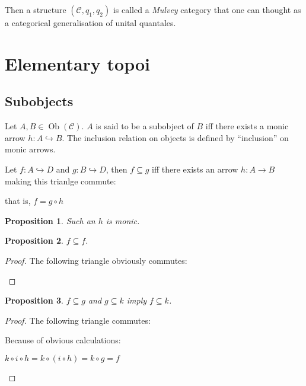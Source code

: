 \documentclass[a4paper]{article}
\theoremstyle{defin}
\theoremstyle{theorem}
\theoremstyle{claim}
\theoremstyle{prop}
\newtheorem{prop}{Proposition}
\theoremstyle{lemma}
\theoremstyle{fact}
\theoremstyle{ex}
\theoremstyle{col}
\begin{document}
Then a structure $(\mathcal{C}, q_1, q_2)$ is called a \emph{Mulvey} category that one can thought as a categorical generalisation of unital quantales.

\section{Elementary topoi}

\subsection{Subobjects}

Let $A, B \in \operatorname{Ob}(\mathcal{C})$. $A$ is said to be a subobject of $B$ iff there exists a monic arrow $h : A \hookrightarrow B$. The inclusion relation on objects is defined by ``inclusion'' on monic arrows.

Let $f : A \hookrightarrow D$ and $g : B \hookrightarrow D$, then $f \subseteq g$ iff there exists an arrow $h : A \to B$ making this trianlge commute:

\centerline{
}
that is, $f = g \circ h$

\begin{prop}
Such an $h$ is monic.
\end{prop}

\begin{prop}
$f \subseteq f$.
\end{prop}

\begin{proof}
The following triangle obviously commutes:

\centerline{
}
\end{proof}

\begin{prop}
$f \subseteq g$ and $g \subseteq k$ imply $f \subseteq k$.
\end{prop}

\begin{proof}
The following triangle commutes:

\centerline{
}
Because of obvious calculations:
\begin{center}
$k \circ i \circ h = k \circ (i \circ h) = k \circ g = f$
\end{center}
\end{proof}
\end{document}
